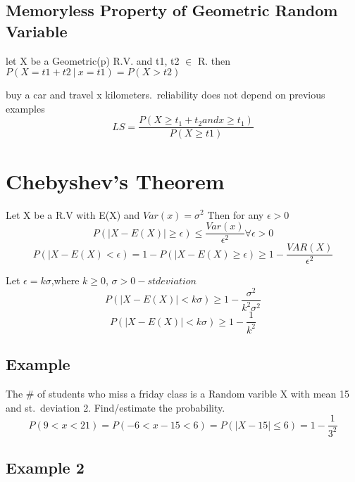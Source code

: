 \documentclass[11pt]{amsart}
\begin{document}
\subsection{Memoryless Property of Geometric Random Variable}
\par let X be a Geometric(p) R.V. and t1, t2 $\in$ R. then $P(X=t1+t2\ |
\ x=t1)=P(X>t2)$
\par buy a car and travel x kilometers.\ reliability does not depend on previous
examples
\begin{equation}
  LS = \frac{P( X \geq t_1 +t_2 and x \ge t_1)}{P(X \ge t1)}
\end{equation}
\section{Chebyshev's Theorem}
\par Let X be a R.V with E(X)  and  $Var(x) = \sigma^2 $ Then for any $\epsilon
> 0 $
\begin{equation}
  P(|X-E(X)| \ge \epsilon ) \le \frac{Var(x)}{\epsilon^2} \forall \epsilon >
  0
\end{equation}
\begin{equation}
  P(|X-E(X)< \epsilon) = 1-P(|X-E(X) \ge \epsilon) \ge
  1-\frac{VAR(X)}{\epsilon^2}
\end{equation}
\par Let $\epsilon = k\sigma$,where $k \ge 0$, $\sigma > 0-st deviation$
\begin{equation}
  P(|X-E(X)|<k\sigma)\ge 1 - \frac{\sigma^2}{k^2\sigma^2}
\end{equation}
\begin{equation}
  P(|X-E(X)|<k\sigma)\ge 1 - \frac{1} {k^2}
\end{equation}
\subsection{Example}
\par The \# of students who miss a friday class is a Random varible X with mean
15 and st.\ deviation 2. Find/estimate the probability.
\begin{equation}
  P(9 < x < 21) = P(-6 < x-15 < 6) = P(|X-15|\le 6) = 1 - \frac{1}{3^2}
\end{equation}
\subsection{Example 2}
\end{document}
